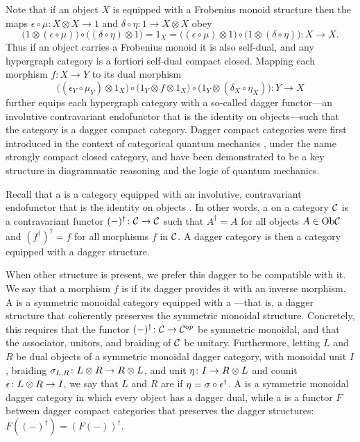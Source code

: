 Note that if an object $X$ is equipped with a Frobenius monoid structure then
the maps $\epsilon \circ \mu\colon  X \otimes X \longrightarrow 1$ and $\delta \circ
\eta\colon  1 \longrightarrow X \otimes X$ obey 
\[
  \big(1 \otimes (\epsilon \circ \mu)\big) \circ \big((\delta \circ \eta)
  \otimes 1\big) = 1_X = \big((\epsilon \circ \mu) \otimes 1\big) \circ \big(1
  \otimes (\delta \circ \eta)\big)\colon X \longrightarrow X.
\]
Thus if an object carries a Frobenius monoid it is also self-dual, and any
hypergraph category is a fortiori self-dual compact closed. Mapping each
morphism $f\colon  X \to Y$ to its dual morphism
\[
  \big((\epsilon_Y \circ \mu_Y) \otimes 1_X\big) \circ \big( 1_Y \otimes f
  \otimes 1_X \big) \circ \big(1_Y \otimes (\delta_X \circ \eta_X)\big)\colon  Y
  \longrightarrow X
\]
further equips each hypergraph category with a so-called dagger functor---an
involutive contravariant endofunctor that is the identity on objects---such that
the category is a dagger compact category. Dagger compact categories were first
introduced in the context of categorical quantum mechanics \cite{AC}, under the
name strongly compact closed category, and have been demonstrated to be a key
structure in diagrammatic reasoning and the logic of quantum mechanics.

Recall that a  is a category equipped with an
involutive, contravariant endofunctor that is the identity on objects
\cite{AC,Se}. In other words, a  on a category $\mathcal C$
is a contravariant functor $(-)^\dagger{\colon} \mathcal C \to \mathcal C$ such that
$A^\dagger = A$ for all objects $A \in \mathrm{Ob} \mathcal C$ and $(f^\dagger)^\dagger = f$
for all morphisms $f$ in $\mathcal C$.  A dagger category is then a category equipped
with a dagger structure.

When other structure is present, we prefer this dagger to be compatible with it.
We say that a morphism $f$ is  if its dagger provides it with an
inverse morphism. A  is a symmetric
monoidal category equipped with a ---that is, a dagger structure that coherently preserves the symmetric
monoidal structure. Concretely, this requires that the functor $(-)^\dagger{\colon}
\mathcal C \to \mathcal C^{\mathrm op}$ be symmetric monoidal, and that the associator,
unitors, and braiding of $\mathcal C$ be unitary. Furthermore, letting $L$ and $R$ be
dual objects of a symmetric monoidal dagger category, with monoidal unit $I$,
braiding $\sigma_{L,R}{\colon} L \otimes R \to R \otimes L$, and unit $\eta{\colon} I \to R
\otimes L$ and counit $\epsilon{\colon} L \otimes R \to I$, we say that $L$ and $R$ are
 if $\eta = \sigma \circ \epsilon^\dagger$.  A  is a symmetric monoidal dagger category in which every object
has a dagger dual, while a  is a functor $F$ between
dagger compact categories that preserves the dagger structures: $F((-)^\dagger)
= (F(-))^\dagger$.

